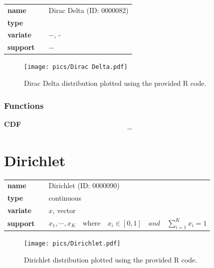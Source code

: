 \documentclass{article}
\begin{document}
  \bigskip 

\begin{tabular}{p{2cm}cl}
\textbf{name} & & Dirac Delta (ID: 0000082)\\ 
 
\textbf{type} & &  \\ 

\textbf{variate} & & $-$, - \\ 

\textbf{support} & & $-$
\end{tabular}

\begin{figure}[ht!]
\centering
  \texttt{[image: pics/Dirac Delta.pdf]}
 \caption{Dirac Delta distribution plotted using the provided R code.}
 \label{fig:Dirac Delta}
\end{figure}

\subsubsection*{Functions}

\smallskip \noindent \hspace{.2cm} \textbf{} 
\begin{equation*}\end{equation*}
\smallskip \noindent \hspace{.2cm} \textbf{CDF} 
\begin{equation*}-\end{equation*}
\smallskip\section*{Dirichlet} 

  \bigskip 

\begin{tabular}{p{2cm}cl}
\textbf{name} & & Dirichlet (ID: 0000090)\\ 
 
\textbf{type} & & continuous \\ 

\textbf{variate} & & $x$, vector \\ 

\textbf{support} & & $x_1, \cdots, x_K \quad\text{where}\quad x_i \in [0,1]\quad and \quad\sum_{i=1}^K x_i = 1$
\end{tabular}

\begin{figure}[ht!]
\centering
  \texttt{[image: pics/Dirichlet.pdf]}
 \caption{Dirichlet distribution plotted using the provided R code.}
 \label{fig:Dirichlet}
\end{figure}
\end{document}
